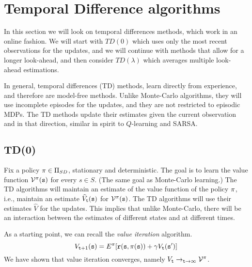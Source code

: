\section{Temporal Difference algorithms}
\label{sec:TD}



In this section we will look on temporal differences methods, which
work in an online fashion. We will start with $TD(0)$ which uses
only the most recent observations for the updates, and we will
continue with methods that allow for a longer look-ahead, and then
consider $TD(\lambda)$ which averages multiple look-ahead
estimations.

In general, temporal differences (TD) methods, learn directly from
experience, and therefore are model-free methods. Unlike Monte-Carlo
algorithms, they will use incomplete episodes for the updates, and
they are not restricted to episodic MDPs. The TD methods update
their estimates given the current observation and in that direction,
similar in spirit to $Q$-learning and SARSA.

\subsection{TD(0)}

Fix a policy $\pi\in \Pi_{SD}$, stationary and deterministic. The goal
is to learn the value function $\mathcal{V}^\pi({\tt s})$ for every
$s\in S$. (The same goal as Monte-Carlo learning.) The TD algorithms
will maintain an estimate of the value function of the policy
$\pi$, i.e., maintain an estimate $\widehat{V}_{\tt t}({\tt s})$
for $\mathcal{V}^\pi({\tt s})$. The TD algorithms will use their
estimates $\widehat{V}$ for the updates. This implies that unlike
Monte-Carlo, there will be an interaction between the estimates of
different states and at different times.

As a starting point, we can recall the {\em value iteration}
algorithm.
\[
V_{{\tt t}+1}({\tt s})=E^\pi[{\tt r}({\tt s},\pi({\tt s}))+\gamma
V_{\tt t}({\tt s}')]
\]
We have shown that value iteration converges, namely $V_{\tt t}
\rightarrow_{{\tt t}\rightarrow\infty} \mathcal{V}^\pi$.

